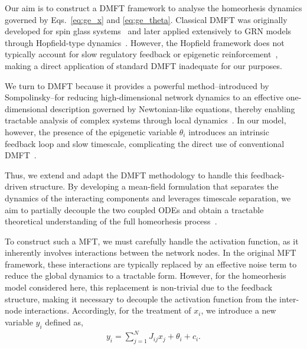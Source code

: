 \documentclass[reprint,amsmath,amssymb,aps]{revtex4-2}
\begin{document}
Our aim is to construct a DMFT framework to analyse the homeorhesis dynamics governed by Eqs.~\eqref{eq:ge_x} and \eqref{eq:ge_theta}. Classical DMFT was originally developed for spin glass systems~\cite{Sompolinsky1988,sompolinsky1982relaxational,crisanti1987dynamics,rajan2010stimulus,panda2017chaos} and later applied extensively to GRN models through Hopfield-type dynamics~\cite{Sompolinsky1988,crisanti1987dynamics,rajan2010stimulus,panda2017chaos}. However, the Hopfield framework does not typically account for slow regulatory feedback or epigenetic reinforcement~\cite{Mehta1,Mehta2}, making a direct application of standard DMFT inadequate for our purposes.

We turn to DMFT because it provides a powerful method--introduced by Sompolinsky--for reducing high-dimensional network dynamics to an effective one-dimensional description governed by Newtonian-like equations, thereby enabling tractable analysis of complex systems through local dynamics~\cite{Sompolinsky1988,crisanti1987dynamics,rajan2010stimulus,panda2017chaos,sompolinsky1982relaxational}. In our model, however, the presence of the epigenetic variable $\theta_i$ introduces an intrinsic feedback loop and slow timescale, complicating the direct use of conventional DMFT~\cite{Sompolinsky1988,crisanti1987dynamics,rajan2010stimulus,panda2017chaos,sompolinsky1982relaxational}.

Thus, we extend and adapt the DMFT methodology to handle this feedback-driven structure. By developing a mean-field formulation that separates the dynamics of the interacting components and leverages timescale separation, we aim to partially decouple the two coupled ODEs and obtain a tractable theoretical understanding of the full homeorhesis process~\cite{matsushita2022dynamical,kaneko2007evolution,miyamoto2015pluripotency,KanekoPRR2020}.

To construct such a MFT, we must carefully handle the activation function, as it inherently involves interactions between the network nodes. In the original MFT framework, these interactions are typically replaced by an effective noise term to reduce the global dynamics to a tractable form. However, for the homeorhesis model considered here, this replacement is non-trivial due to the feedback structure, making it necessary to decouple the activation function from the inter-node interactions. Accordingly, for the treatment of $x_i$, we introduce a new variable $y_i$ defined as,
\begin{align*}
    y_i = \sum_{j=1}^N J_{ij} x_j + \theta_i + c_i.
\end{align*}
\end{document}

